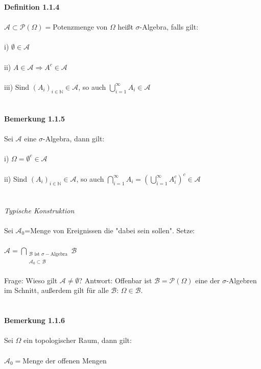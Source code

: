 \documentclass[10pt,a4paper]{report}
\numberwithin{equation}{section}
\numberwithin{figure}{section}
\theoremstyle{plain}
\theoremstyle{definition}
\theoremstyle{plain}
\theoremstyle{definition}
\theoremstyle{remark}
\theoremstyle{plain}
\theoremstyle{plain}
\theoremstyle{plain}
\newcommand{\1}{ \mathbb{1} } %
\begin{document}
\textbf{Definition 1.1.4}\\\\
$\mathcal{A}\subset \mathcal{P}(\Omega)=$Potenzmenge von $\Omega$ heißt $\sigma$-Algebra, falls gilt:\\\\
i) $\emptyset \in \mathcal{A}$\\\\
ii) $A\in \mathcal{A} \Rightarrow A^c \in \mathcal{A}$\\\\
iii) Sind $(A_i)_{i \in \mathbb{N}} \in \mathcal{A}$, so auch $\bigcup\limits_{i=1}^\infty A_i \in \mathcal{A}$\\\\\\
\textbf{Bemerkung 1.1.5}\\\\
Sei $\mathcal{A}$ eine $\sigma$-Algebra, dann gilt:\\\\
i) $\Omega=\emptyset^c \in \mathcal{A}$\\\\
ii) Sind $(A_i)_{i \in \mathbb{N}} \in \mathcal{A}$, so auch $\bigcap\limits_{i=1}^\infty A_i=\left(\bigcup\limits_{i=1}^\infty A_i^c\right)^c \in \mathcal{A}$\\\\\\
\textit{Typische Konstruktion}\\\\
Sei $\mathcal{A}_0$=Menge von Ereignissen die "dabei sein sollen". Setze:\\\\
$\mathcal{A}=\bigcap\limits_{\substack{\mathcal{B} \text{ ist }  \sigma-\text{Algebra}\\ \mathcal{A}_0\subset \mathcal{B}}}\mathcal{B}$\\\\
Frage: Wieso gilt $\mathcal{A}\neq \emptyset$? Antwort: Offenbar ist $\mathcal{B}=\mathcal{P}(\Omega)$ eine der $\sigma$-Algebren im Schnitt, außerdem gilt für alle $\mathcal{B}$: $\Omega \in \mathcal{B}$.\\\\\\
\textbf{Bemerkung 1.1.6}\\\\
Sei $\Omega$ ein topologischer Raum, dann gilt:\\\\
$\mathcal{A}_0=$Menge der offenen Mengen \\\\
\end{document}
